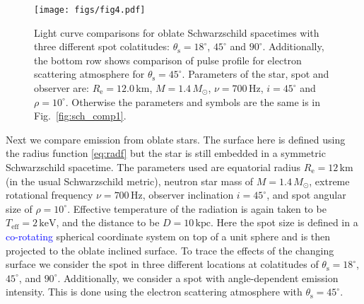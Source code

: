 \documentclass{aa}
\newcommand{\refe}[1]{\textcolor{blue}{{#1}}}
\newcommand{\sch}{Schwarzschild }
\newcommand{\Msun}{\ensuremath{M_{\odot}}}
\begin{document}
\begin{figure}
\centering
\texttt{[image: figs/fig4.pdf]}
\caption{\label{fig:osch_comp700}
  Light curve comparisons for oblate \sch spacetimes with three different spot colatitudes: $\theta_{\mathrm{s}} = 18^{\circ}$, $45^{\circ}$ and $90^{\circ}$.
  Additionally, the bottom row shows comparison of pulse profile for electron scattering atmosphere for $\theta_{\mathrm{s}} = 45^{\circ}$.
  Parameters of the star, spot and observer are: $R_{\mathrm{e}} = 12.0\,\mathrm{km}$, $M = 1.4\,\Msun$, $\nu = 700\,\mathrm{Hz}$, $i = 45^{\circ}$ and $\rho = 10^{\circ}$.
  Otherwise the parameters and symbols are the same is in Fig.~\ref{fig:sch_comp1}.
  }
\end{figure}

Next we compare emission from oblate stars.
The surface here is defined using the radius function \eqref{eq:radf} but the star is still embedded in a symmetric \sch spacetime.
The parameters used are equatorial radius $R_{\mathrm{e}} = 12\,\mathrm{km}$ (in the usual \sch metric), neutron star mass of $M = 1.4\,\Msun$, extreme rotational frequency $\nu = 700\,\mathrm{Hz}$, observer inclination $i=45^{\circ}$, and spot angular size of $\rho = 10^{\circ}$.
Effective temperature of the radiation is again taken to be $T_{\mathrm{eff}} = 2\,\mathrm{keV}$, and the distance to be $D = 10\,\mathrm{kpc}$.
Here the spot size is defined in a \refe{co-rotating} spherical coordinate system on top of a unit sphere and is then projected to the oblate inclined surface.
To trace the effects of the changing surface we consider the spot in three different locations at colatitudes of $\theta_{\mathrm{s}} = 18^{\circ}$, $45^{\circ}$, and $90^{\circ}$.
Additionally, we consider a spot with angle-dependent emission intensity.
This is done using the electron scattering atmosphere with $\theta_{\mathrm{s}} = 45^{\circ}$.
\end{document}
